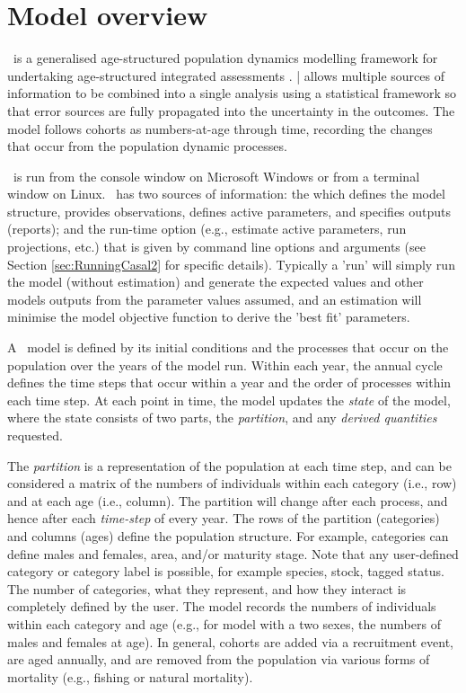 \section{Model overview\label{sec:Overview}}

\CNAME\ is a generalised age-structured population dynamics modelling framework for undertaking age-structured integrated assessments \citep{Maunder_2013}. \CNAME| allows multiple sources of information to be combined into a single analysis using a statistical framework so that error sources are fully propagated into the uncertainty in the outcomes. The model follows cohorts as numbers-at-age through time, recording the changes that occur from the population dynamic processes.

\CNAME\ is run from the console window on Microsoft Windows or from a terminal window on Linux. \CNAME\ has two sources of information: the \emph{\config} which  defines the model structure, provides observations, defines active parameters, and specifies outputs (reports); and the run-time option (e.g., estimate active parameters, run projections, etc.) that is given by command line options and arguments (see Section \ref{sec:RunningCasal2} for specific details). Typically a 'run' will simply run the model (without estimation) and generate the expected values and other models outputs from the parameter values assumed, and an estimation will minimise the model objective function to derive the 'best fit' parameters.

A \CNAME\ model is defined by its initial conditions and the processes that occur on the population over the years of the model run. Within each year, the annual cycle defines the time steps that occur within a year and the order of processes within each time step. At each point in time, the model updates the \emph{state} of the model, where the state consists of two parts, the \emph{partition}, and any \emph{derived quantities} requested.

The \emph{partition} is a representation of the population at each time step, and can be considered a matrix of the numbers of individuals within each category (i.e., row) and at each age (i.e., column). The partition will change after each process, and hence after each \emph{time-step} of every year. The rows of the partition (categories) and columns (ages) define the population structure. For example, categories can define males and females, area, and/or maturity stage. Note that any user-defined category or category label is possible, for example species, stock, tagged status. The number of categories, what they represent, and how they interact is completely defined by the user. The model records the numbers of individuals within each category and age (e.g., for model with a two sexes, the numbers of males and females at age). In general, cohorts are added via a recruitment event, are aged annually, and are removed from the population via various forms of mortality (e.g., fishing or natural mortality).


